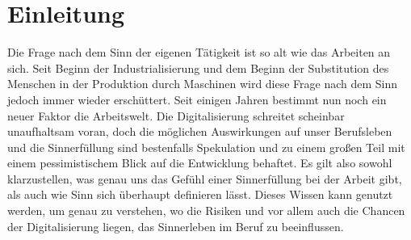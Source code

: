\chapter{Einleitung}
Die Frage nach dem Sinn der eigenen Tätigkeit ist so alt wie das Arbeiten an sich. Seit Beginn der Industrialisierung und dem Beginn der Substitution des Menschen in der Produktion durch Maschinen wird diese Frage nach dem Sinn jedoch immer wieder erschüttert. Seit einigen Jahren bestimmt nun noch ein neuer Faktor die Arbeitswelt. Die Digitalisierung schreitet scheinbar unaufhaltsam voran, doch die möglichen Auswirkungen auf unser Berufsleben und die Sinnerfüllung sind bestenfalls Spekulation und zu einem großen Teil mit einem pessimistischem Blick auf die Entwicklung behaftet. Es gilt also sowohl klarzustellen, was genau uns das Gefühl einer Sinnerfüllung bei der Arbeit gibt, als auch wie Sinn sich überhaupt definieren lässt. Dieses Wissen kann genutzt werden, um genau zu verstehen, wo die Risiken und vor allem auch die Chancen der Digitalisierung liegen, das Sinnerleben im Beruf zu beeinflussen.